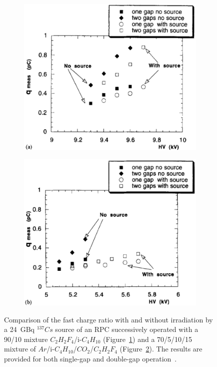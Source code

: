 	\begin{figure}[H]
		\begin{subfigure}{0.5\linewidth}
			\centering
			\includegraphics[width = 0.5\plotwidth]{fig/chapt4/Freon-fast-charge-irrad.png}
			\caption{\label{fig:FreonArgonFastCharge:A}}
		\end{subfigure}
		\begin{subfigure}{0.5\linewidth}
			\centering
			\includegraphics[width = 0.5\plotwidth]{fig/chapt4/Argon-fast-charge-irrad.png}
			\caption{\label{fig:FreonArgonFastCharge:B}}
		\end{subfigure}
		\caption{\label{fig:FreonArgonFastCharge} Comparison of the fast charge ratio with and without irradiation by a \SI{24}{GBq} $^{137}Cs$ source of an RPC successively operated with a 90/10 mixture $C_2H_2F_4$/i-$C_4H_{10}$ (Figure~\ref{fig:FreonArgonFastCharge:A}) and a 70/5/10/15 mixture of $Ar$/i-$C_4H_{10}$/$CO_2$/$C_2H_2F_4$ (Figure~\ref{fig:FreonArgonFastCharge:B}). The results are provided for both single-gap and double-gap operation~\cite{ABBRESCIA1997PERF}.}
	\end{figure}
	
